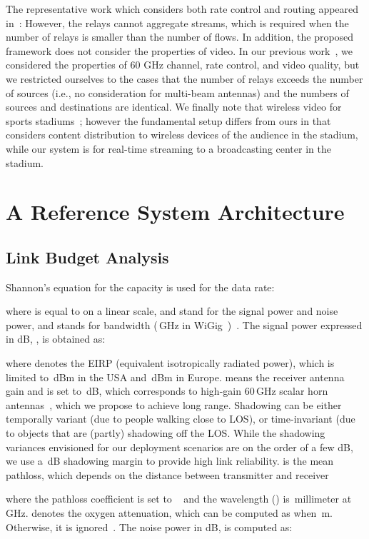 \documentclass[conference]{IEEEtran}
\begin{document}
The representative work which considers both rate control and routing appeared in~\cite{jsac12thou}: However, the relays cannot aggregate streams, which is required when the number of relays is smaller than the number of flows. In addition, the proposed framework does not consider the properties of video. In our previous work~\cite{kim11pimrc}, we considered the properties of 60 GHz channel, rate control, and video quality, but we restricted ourselves to the cases that the number of relays exceeds the number of sources (i.e., no consideration for multi-beam antennas) and the numbers of sources and destinations are identical.
We finally note that wireless video for sports stadiums~\cite{disney_wowmom}; however the fundamental setup differs from ours in that~\cite{disney_wowmom} considers content distribution to wireless devices of the audience in the stadium, while our system is for real-time streaming to a broadcasting center in the stadium.

\section{A Reference System Architecture}\label{sec:refsysmodel}

\subsection{Link Budget Analysis}\label{sec:refsysmodel-lba}
Shannon's equation for the capacity is used for the data rate:

where  is equal to  on a linear scale,  and  stand for the signal power and noise power, and  stands for bandwidth (\,GHz in WiGig~\cite{11ad})~\cite{molisch11book}.
The signal power expressed in dB, , is obtained as:

where  denotes the EIRP (equivalent isotropically radiated power), which is limited to \,dBm in the USA and \,dBm in Europe.
 means the receiver antenna gain and is set to \,dB, which corresponds to high-gain 60\,GHz scalar horn antennas~\cite{comotech}, which we propose to achieve long range.
Shadowing can be either temporally variant (due to people walking close to LOS), or time-invariant (due to objects that are (partly) shadowing off the LOS. While the shadowing variances envisioned for our deployment scenarios are on the order of a few dB, we use a \,dB shadowing margin to provide high link reliability.
 is the mean pathloss, which depends on the distance  between transmitter and receiver

where the pathloss coefficient  is set to ~\cite{60ghz} and the wavelength () is
\,millimeter at \,GHz.
 denotes the oxygen attenuation, which can be computed as  when \,m. Otherwise, it is ignored~\cite{60ghz}.
The noise power in dB,  is computed as:
\end{document}
